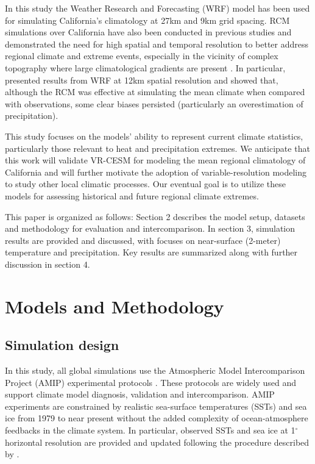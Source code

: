 In this study the Weather Research and Forecasting (WRF) \cite{skamarock2005coauthors} model has been used for simulating California's climatology at 27km and 9km grid spacing. RCM simulations over California have also been conducted in previous studies and demonstrated the need for high spatial and temporal resolution to better address regional climate and extreme events, especially in the vicinity of complex topography where large climatological gradients are present \cite{leung2004mid, kanamitsu2007fifty, caldwell2009evaluation, pan2011influences, pierce2013probabilistic}. In particular, \cite{caldwell2009evaluation} presented results from WRF at 12km spatial resolution and showed that, although the RCM was effective at simulating the mean climate when compared with observations, some clear biases persisted (particularly an overestimation of precipitation).

This study focuses on the models' ability to represent current climate statistics, particularly those relevant to heat and precipitation extremes. We anticipate that this work will validate VR-CESM for modeling the mean regional climatology of California and will further motivate the adoption of variable-resolution modeling to study other local climatic processes. Our eventual goal is to utilize these models for assessing historical and future regional climate extremes.

This paper is organized as follows: Section 2 describes the model setup, datasets and methodology for evaluation and intercomparison. In section 3, simulation results are provided and discussed, with focuses on near-surface (2-meter) temperature and precipitation. Key results are summarized along with further discussion in section 4.

\section{Models and Methodology}

\subsection{Simulation design} 

In this study, all global simulations use the Atmospheric Model Intercomparison Project (AMIP) experimental protocols \cite{Gates1992}. These protocols are widely used and support climate model diagnosis, validation and intercomparison. AMIP experiments are constrained by realistic sea-surface temperatures (SSTs) and sea ice from 1979 to near present without the added complexity of ocean-atmosphere feedbacks in the climate system. In particular, observed SSTs and sea ice at 1$^\circ$ horizontal resolution are provided and updated following the procedure described by \cite{hurrell2008new}.

